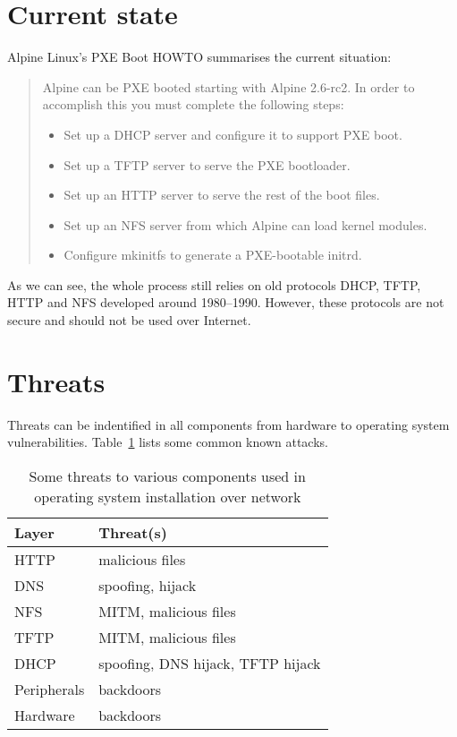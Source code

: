 \section{Current state}

Alpine Linux's PXE Boot HOWTO\cite{alpine-pxe-boot-howto} summarises
the current situation:

\begin{quote}
Alpine can be PXE booted starting with Alpine 2.6-rc2. In order to
accomplish this you must complete the following steps:

\begin{itemize}
\item Set up a DHCP server and configure it to support PXE boot.
\item Set up a TFTP server to serve the PXE bootloader.
\item Set up an HTTP server to serve the rest of the boot files.
\item Set up an NFS server from which Alpine can load kernel modules.
\item Configure mkinitfs to generate a PXE-bootable initrd.
\end{itemize}
\end{quote}

As we can see, the whole process still relies on old protocols DHCP,
TFTP, HTTP and NFS developed around 1980--1990. However, these
protocols are not secure and should not be used over Internet.


\section{Threats}

Threats can be indentified in all components from hardware to operating
system vulnerabilities. Table~\ref{tab:threats_table} lists some common
known attacks.

\begin{table}[!ht]
  \def\arraystretch{1.1}%
  \begin{center}
    \label{tab:threats_table}
    \begin{tabular}{| l | l |}
      \hline
      Layer       & Threat(s) \\
      \hline
      HTTP        & malicious files \\
      DNS         & spoofing, hijack \\
      NFS         & MITM, malicious files \\
      TFTP        & MITM, malicious files \\
      DHCP        & spoofing, DNS hijack, TFTP hijack \\
      Peripherals & backdoors \\
      Hardware    & backdoors \\
      \hline
    \end{tabular}
    \caption{Some threats to various components used in operating
      system installation over network}
  \end{center}
\end{table}

